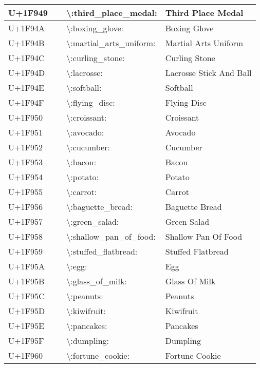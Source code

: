 \begin{table}[h]
\begin{tabulary}{\linewidth}{|L|L|L|L|}
\hline
U+1F949 & 🥉 & {\textbackslash}:third\_place\_medal: & Third Place Medal \\
\hline
U+1F94A & 🥊 & {\textbackslash}:boxing\_glove: & Boxing Glove \\
\hline
U+1F94B & 🥋 & {\textbackslash}:martial\_arts\_uniform: & Martial Arts Uniform \\
\hline
U+1F94C & 🥌 & {\textbackslash}:curling\_stone: & Curling Stone \\
\hline
U+1F94D & 🥍 & {\textbackslash}:lacrosse: & Lacrosse Stick And Ball \\
\hline
U+1F94E & 🥎 & {\textbackslash}:softball: & Softball \\
\hline
U+1F94F & 🥏 & {\textbackslash}:flying\_disc: & Flying Disc \\
\hline
U+1F950 & 🥐 & {\textbackslash}:croissant: & Croissant \\
\hline
U+1F951 & 🥑 & {\textbackslash}:avocado: & Avocado \\
\hline
U+1F952 & 🥒 & {\textbackslash}:cucumber: & Cucumber \\
\hline
U+1F953 & 🥓 & {\textbackslash}:bacon: & Bacon \\
\hline
U+1F954 & 🥔 & {\textbackslash}:potato: & Potato \\
\hline
U+1F955 & 🥕 & {\textbackslash}:carrot: & Carrot \\
\hline
U+1F956 & 🥖 & {\textbackslash}:baguette\_bread: & Baguette Bread \\
\hline
U+1F957 & 🥗 & {\textbackslash}:green\_salad: & Green Salad \\
\hline
U+1F958 & 🥘 & {\textbackslash}:shallow\_pan\_of\_food: & Shallow Pan Of Food \\
\hline
U+1F959 & 🥙 & {\textbackslash}:stuffed\_flatbread: & Stuffed Flatbread \\
\hline
U+1F95A & 🥚 & {\textbackslash}:egg: & Egg \\
\hline
U+1F95B & 🥛 & {\textbackslash}:glass\_of\_milk: & Glass Of Milk \\
\hline
U+1F95C & 🥜 & {\textbackslash}:peanuts: & Peanuts \\
\hline
U+1F95D & 🥝 & {\textbackslash}:kiwifruit: & Kiwifruit \\
\hline
U+1F95E & 🥞 & {\textbackslash}:pancakes: & Pancakes \\
\hline
U+1F95F & 🥟 & {\textbackslash}:dumpling: & Dumpling \\
\hline
U+1F960 & 🥠 & {\textbackslash}:fortune\_cookie: & Fortune Cookie \\

\end{tabulary}
\end{table}
